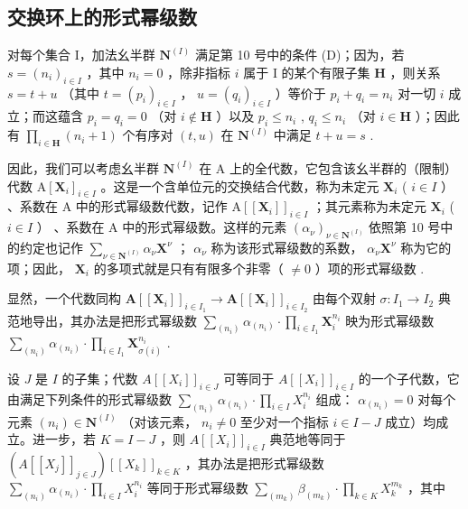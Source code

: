 \subsection{交换环上的形式幂级数}

对每个集合 I，加法幺半群 \(\mathbf{N}^{(I)}\) 满足第 10 号中的条件 (D)；因为，若 \(s = (n_i)_{i \in I}\) ，其中 \(n_i = 0\) ，除非指标 \(i\) 属于 I 的某个有限子集 \(\mathbf{H}\) ，则关系 \(s = t + u\) （其中 \(t = (p_i)_{i \in I}\) ， \(u = (q_i)_{i \in I}\) ）等价于 \(p_i + q_i = n_i\) 对一切 \(i\) 成立；而这蕴含 \(p_i = q_i = 0\) （对 \(i \notin \mathbf{H}\) ）以及 \(p_i \leqslant n_i\) , \(q_i \leqslant n_i\) （对 \(i \in \mathbf{H}\) ）；因此有 \(\prod_{i \in \mathbf{H}} (n_i + 1)\) 个有序对 \((t, u)\) 在 \(\mathbf{N}^{(I)}\) 中满足 \(t + u = s\) .

因此，我们可以考虑幺半群 \(\mathbf{N}^{(I)}\) 在 A 上的全代数，它包含该幺半群的（限制）代数 \(\mathrm{A}[\mathbf{X}_i]_{i\in I}\) 。这是一个含单位元的交换结合代数，称为未定元 \(\mathbf{X}_i\) ( \(i\in I\) ） 、系数在 A 中的形式幂级数代数，记作 \(\mathrm{A}[[\mathbf{X}_i]]_{i\in I}\) ；其元素称为未定元 \(\mathbf{X}_i\) ( \(i\in I\) ） 、系数在 A 中的形式幂级数。这样的元素 \((\alpha_{\nu})_{\nu \in \mathbf{N}^{(I)}}\) 依照第 10 号中的约定也记作 \(\sum_{\nu \in \mathbf{N}^{(I)}}\alpha_{\nu}\mathbf{X}^{\nu}\) ； \(\alpha_{\nu}\) 称为该形式幂级数的系数， \(\alpha_{\nu}\mathbf{X}^{\nu}\) 称为它的项；因此， \(\mathbf{X}_i\) 的多项式就是只有有限多个非零（ \(\neq 0\) ）项的形式幂级数 .

显然，一个代数同构 \(\mathbf{A}[[\mathbf{X}_i]]_{i\in I_1}\to \mathbf{A}[[\mathbf{X}_i]]_{i\in I_2}\) 由每个双射 \(\sigma \colon I_1\to I_2\) 典范地导出，其办法是把形式幂级数 \(\sum_{(n_i)}\alpha_{(n_i)}\cdot \prod_{i\in I_1}\mathbf{X}_i^{n_i}\) 映为形式幂级数 \(\sum_{(n_i)}\alpha_{(n_i)}\cdot \prod_{i\in I_1}\mathbf{X}_{\sigma (i)}^{n_i}\) .

设 \(J\) 是 \(I\) 的子集；代数 \(A[[X_i]]_{i \in J}\) 可等同于 \(A[[X_i]]_{i \in I}\) 的一个子代数，它由满足下列条件的形式幂级数 \(\sum_{(n_i)} \alpha_{(n_i)} \cdot \prod_{i \in I} X_i^{n_i}\) 组成： \(\alpha_{(n_i)} = 0\) 对每个元素 \((n_i) \in \mathbf{N}^{(I)}\) （对该元素， \(n_i \neq 0\) 至少对一个指标 \(i \in I - J\) 成立）均成立。进一步，若 \(K = I - J\) ，则 \(A[[X_i]]_{i \in I}\) 典范地等同于 \((A[[X_j]]_{j \in J})[[X_k]]_{k \in K}\) ，其办法是把形式幂级数 \(\sum_{(n_i)} \alpha_{(n_i)} \cdot \prod_{i \in I} X_i^{n_i}\) 等同于形式幂级数 \(\sum_{(m_k)} \beta_{(m_k)} \cdot \prod_{k \in K} X_k^{m_k}\) ，其中


